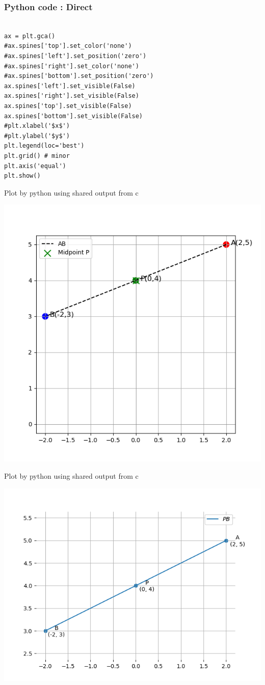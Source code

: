 \documentclass{beamer}
\begin{document}
\begin{frame}[fragile]
	\frametitle{Python code : Direct }
	
	\begin{lstlisting}

ax = plt.gca()
#ax.spines['top'].set_color('none')
#ax.spines['left'].set_position('zero')
#ax.spines['right'].set_color('none')
#ax.spines['bottom'].set_position('zero')
ax.spines['left'].set_visible(False)
ax.spines['right'].set_visible(False)
ax.spines['top'].set_visible(False)
ax.spines['bottom'].set_visible(False)
#plt.xlabel('$x$')
#plt.ylabel('$y$')
plt.legend(loc='best')
plt.grid() # minor
plt.axis('equal')
plt.show()
 \end{lstlisting}

 \end{frame}

\begin{frame}{Plot by python using shared output from c}
	\begin{center}
		\includegraphics[width=0.6\columnwidth]{figs/Figure_2.png}
	\end{center}
\end{frame}


\begin{frame}{Plot by python using shared output from c}
	\begin{center}
		\includegraphics[width=0.6\columnwidth]{figs/Figure_1.png}
	\end{center}
\end{frame}
\end{document}
